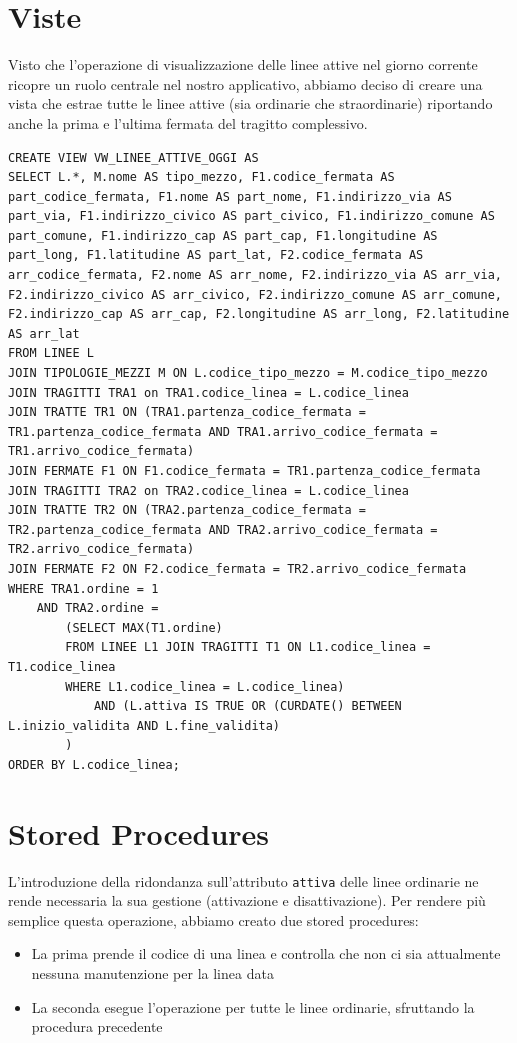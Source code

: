 \documentclass[12pt,a4paper]{report}
\begin{document}
\section{Viste}
Visto che l'operazione di visualizzazione delle linee attive nel giorno corrente ricopre un ruolo centrale nel nostro applicativo, abbiamo deciso di creare una vista che estrae tutte le linee attive (sia ordinarie che straordinarie) riportando anche la prima e l'ultima fermata del tragitto complessivo. \\
\begin{lstlisting}[style=sqlstyle, label=code:lines_view, caption=Codice SQL per la creazione della vista]
CREATE VIEW VW_LINEE_ATTIVE_OGGI AS
SELECT L.*, M.nome AS tipo_mezzo, F1.codice_fermata AS part_codice_fermata, F1.nome AS part_nome, F1.indirizzo_via AS part_via, F1.indirizzo_civico AS part_civico, F1.indirizzo_comune AS part_comune, F1.indirizzo_cap AS part_cap, F1.longitudine AS part_long, F1.latitudine AS part_lat, F2.codice_fermata AS arr_codice_fermata, F2.nome AS arr_nome, F2.indirizzo_via AS arr_via, F2.indirizzo_civico AS arr_civico, F2.indirizzo_comune AS arr_comune, F2.indirizzo_cap AS arr_cap, F2.longitudine AS arr_long, F2.latitudine AS arr_lat
FROM LINEE L
JOIN TIPOLOGIE_MEZZI M ON L.codice_tipo_mezzo = M.codice_tipo_mezzo
JOIN TRAGITTI TRA1 on TRA1.codice_linea = L.codice_linea
JOIN TRATTE TR1 ON (TRA1.partenza_codice_fermata = TR1.partenza_codice_fermata AND TRA1.arrivo_codice_fermata = TR1.arrivo_codice_fermata)
JOIN FERMATE F1 ON F1.codice_fermata = TR1.partenza_codice_fermata
JOIN TRAGITTI TRA2 on TRA2.codice_linea = L.codice_linea
JOIN TRATTE TR2 ON (TRA2.partenza_codice_fermata = TR2.partenza_codice_fermata AND TRA2.arrivo_codice_fermata = TR2.arrivo_codice_fermata)
JOIN FERMATE F2 ON F2.codice_fermata = TR2.arrivo_codice_fermata
WHERE TRA1.ordine = 1
    AND TRA2.ordine =
        (SELECT MAX(T1.ordine)
        FROM LINEE L1 JOIN TRAGITTI T1 ON L1.codice_linea = T1.codice_linea
        WHERE L1.codice_linea = L.codice_linea)
            AND (L.attiva IS TRUE OR (CURDATE() BETWEEN L.inizio_validita AND L.fine_validita)
        )
ORDER BY L.codice_linea;
\end{lstlisting}

\section{Stored Procedures}
L'introduzione della ridondanza sull'attributo \texttt{attiva} delle linee ordinarie ne rende necessaria la sua gestione (attivazione e disattivazione). Per rendere più semplice questa operazione, abbiamo creato due stored procedures:
\begin{itemize}
	\item La prima prende il codice di una linea e controlla che non ci sia attualmente nessuna manutenzione per la linea data
	\item La seconda esegue l'operazione per tutte le linee ordinarie, sfruttando la procedura precedente
\end{itemize}
\end{document}
